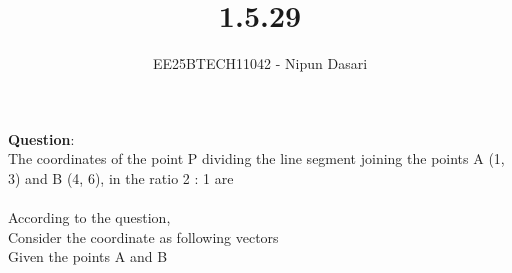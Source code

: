 \documentclass[journal]{IEEEtran}
\begin{document}
	
	
	\vspace{3cm}
	
	\title{1.5.29}
	\author{EE25BTECH11042 - Nipun Dasari}
	\maketitle
	{\let\newpage\relax\maketitle}
	
	\renewcommand{\thefigure}{\theenumi}
	\renewcommand{\thetable}{\theenumi}
	\setlength{\intextsep}{10pt} %
	
	
	\renewcommand{\thetable}{\theenumi}
	
	\textbf{Question}:\\
	The coordinates of the point P dividing the line segment joining the points A (1, 3)
	and B (4, 6), in the ratio 2 : 1 are \\ 
	\solution \\
	According to the question, \\
	Consider the coordinate as following vectors \\ 

	Given the points A and B
	
\end{document}
